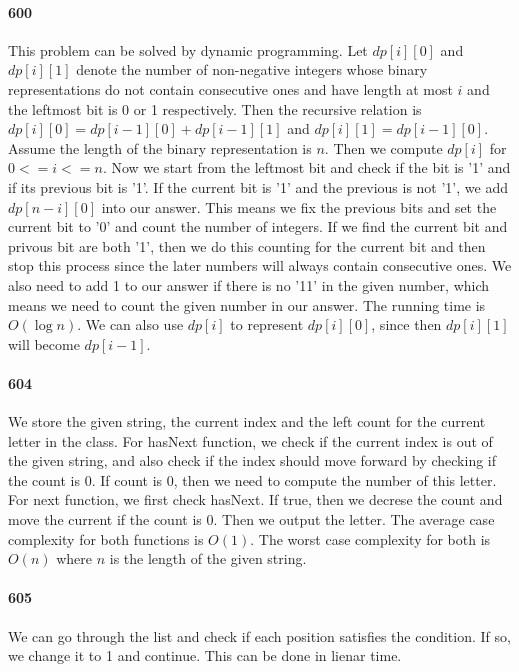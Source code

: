 \documentclass[11pt]{article}
\begin{document}
\begin{itemize}
\paragraph{600}
This problem can be solved by dynamic programming. Let $dp[i][0]$ and $dp[i][1]$ denote the number of non-negative integers 
whose binary representations do not contain consecutive ones and have length at most $i$ and the leftmost bit is 0 or 1
respectively. Then the recursive relation is $dp[i][0] = dp[i-1][0] + dp[i-1][1]$ and $dp[i][1] = dp[i-1][0]$. Assume the 
length of the binary representation is $n$. Then we compute $dp[i]$ for $0 <= i <= n$. Now we start from the leftmost bit and 
check if the bit is '1' and if its previous bit is '1'. If the current bit is '1' and the previous is not '1', we add 
$dp[n-i][0]$ into our answer. This means we fix the previous bits and set the current bit to '0' and count the number of 
integers. If we find the current bit and privous bit are both '1', then we do this counting for the current bit and then stop
this process since the later numbers will always contain consecutive ones.
We also need to add 1 to our answer if there is no '11' in the given number, which means we need to count the given number in
our answer. The running time is $O(\log n)$.
We can also use $dp[i]$ to represent $dp[i][0]$, since then $dp[i][1]$ will become $dp[i-1]$. 

\paragraph{604}
We store the given string, the current index and the left count for the current letter in the class.
For hasNext function, we check if the current index is out of the given string, and also check if the index should move 
forward by checking if the count is 0. If count is 0, then we need to compute the number of this letter. 
For next function, we first check hasNext. If true, then we decrese the count and move the current if the count is 0.
Then we output the letter.
The average case complexity for both functions is $O(1)$. The worst case complexity for both is $O(n)$ where $n$ is the length
of the given string. 


\paragraph{605}
We can go through the list and check if each position satisfies the condition. If so, we change it to 1 and continue.
This can be done in lienar time.


\end{itemize}
\end{document}
